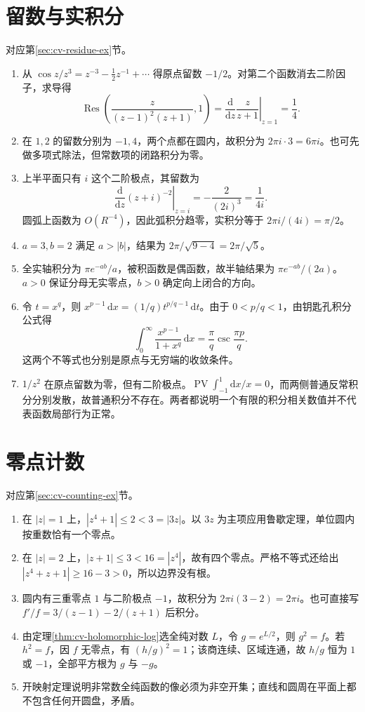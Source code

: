 \documentclass[UTF8,12pt,a4paper,fontset=fandol]{ctexbook}
\begin{document}
\section{留数与实积分}
对应第\ref{sec:cv-residue-ex}节。
\begin{enumerate}
 \item 从 $\cos z/z^3=z^{-3}-\tfrac12z^{-1}+\cdots$ 得原点留数 $-1/2$。对第二个函数消去二阶因子，求导得
 \[
 \operatorname{Res}\left(\frac z{(z-1)^2(z+1)},1\right)
 =\left.\frac{\mathrm d}{\mathrm dz}\frac z{z+1}\right|_{z=1}
 =\frac14.
 \]
 \item 在 $1,2$ 的留数分别为 $-1,4$，两个点都在圆内，故积分为 $2\pi i\cdot3=6\pi i$。也可先做多项式除法，但常数项的闭路积分为零。
 \item 上半平面只有 $i$ 这个二阶极点，其留数为
 \[
 \left.\frac{\mathrm d}{\mathrm dz}(z+i)^{-2}\right|_{z=i}
 =-\frac2{(2i)^3}=\frac1{4i}.
 \]
 圆弧上函数为 $O(R^{-4})$，因此弧积分趋零，实积分等于 $2\pi i/(4i)=\pi/2$。
 \item $a=3,b=2$ 满足 $a>|b|$，结果为 $2\pi/\sqrt{9-4}=2\pi/\sqrt5$。
 \item 全实轴积分为 $\pi e^{-ab}/a$，被积函数是偶函数，故半轴结果为 $\pi e^{-ab}/(2a)$。$a>0$ 保证分母无实零点，$b>0$ 确定向上闭合的方向。
 \item 令 $t=x^q$，则 $x^{p-1}\,\mathrm dx=(1/q)t^{p/q-1}\,\mathrm dt$。由于 $0<p/q<1$，由钥匙孔积分公式得
 \[
 \int_0^\infty\frac{x^{p-1}}{1+x^q}\,\mathrm dx
 =\frac\pi q\csc\frac{\pi p}q.
 \]
 这两个不等式也分别是原点与无穷端的收敛条件。
 \item $1/z^2$ 在原点留数为零，但有二阶极点。$\operatorname{PV}\int_{-1}^1\mathrm dx/x=0$，而两侧普通反常积分分别发散，故普通积分不存在。两者都说明一个有限的积分相关数值并不代表函数局部行为正常。
\end{enumerate}

\section{零点计数}
对应第\ref{sec:cv-counting-ex}节。
\begin{enumerate}
 \item 在 $|z|=1$ 上，$|z^4+1|\le2<3=|3z|$。以 $3z$ 为主项应用鲁歇定理，单位圆内按重数恰有一个零点。
 \item 在 $|z|=2$ 上，$|z+1|\le3<16=|z^4|$，故有四个零点。严格不等式还给出 $|z^4+z+1|\ge16-3>0$，所以边界没有根。
 \item 圆内有三重零点 $1$ 与二阶极点 $-1$，故积分为 $2\pi i(3-2)=2\pi i$。也可直接写 $f'/f=3/(z-1)-2/(z+1)$ 后积分。
 \item 由定理\ref{thm:cv-holomorphic-log}选全纯对数 $L$，令 $g=e^{L/2}$，则 $g^2=f$。若 $h^2=f$，因 $f$ 无零点，有 $(h/g)^2=1$；该商连续、区域连通，故 $h/g$ 恒为 $1$ 或 $-1$，全部平方根为 $g$ 与 $-g$。
 \item 开映射定理说明非常数全纯函数的像必须为非空开集；直线和圆周在平面上都不包含任何开圆盘，矛盾。
\end{enumerate}
\end{document}
